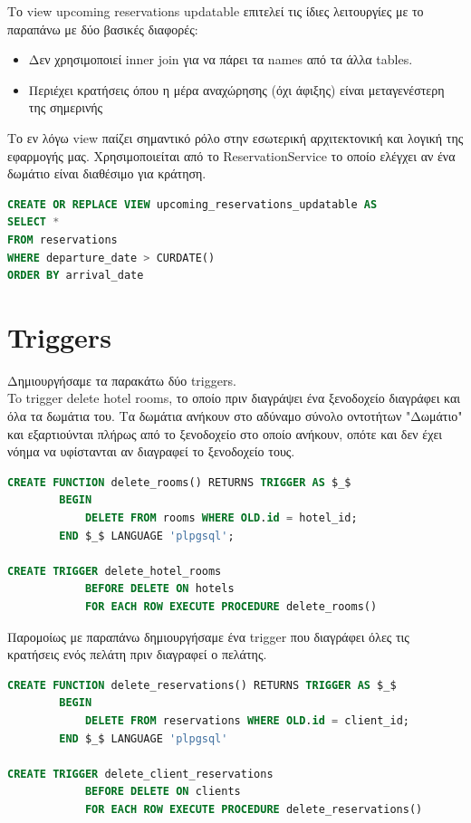 \documentclass[a4paper,12pt]{article}
\begin{document}
Το view upcoming reservations updatable επιτελεί τις ίδιες λειτουργίες με το παραπάνω με δύο βασικές διαφορές:
\begin{itemize}
  \item Δεν χρησιμοποιεί inner join για να πάρει τα names από τα άλλα tables.
  \item Περιέχει κρατήσεις όπου η μέρα αναχώρησης (όχι άφιξης) είναι μεταγενέστερη της σημερινής
\end{itemize}
Το εν λόγω view παίζει σημαντικό ρόλο στην εσωτερική αρχιτεκτονική και λογική της εφαρμογής μας. Χρησιμοποιείται από το ReservationService το οποίο ελέγχει αν ένα δωμάτιο είναι διαθέσιμο για κράτηση.

\begin{lstlisting}[language=SQL]
CREATE OR REPLACE VIEW upcoming_reservations_updatable AS
SELECT *
FROM reservations
WHERE departure_date > CURDATE()
ORDER BY arrival_date
\end{lstlisting}

\section{Triggers}
Δημιουργήσαμε τα παρακάτω δύο triggers.\\
To trigger delete hotel rooms, το οποίο πριν διαγράψει ένα ξενοδοχείο διαγράφει και όλα τα δωμάτια του. Τα δωμάτια ανήκουν στο  αδύναμο σύνολο οντοτήτων "Δωμάτιο" και εξαρτιούνται πλήρως από το ξενοδοχείο στο οποίο ανήκουν, οπότε και δεν έχει νόημα να υφίστανται αν διαγραφεί το ξενοδοχείο τους.

\begin{lstlisting}[language=SQL]
CREATE FUNCTION delete_rooms() RETURNS TRIGGER AS $_$
        BEGIN
            DELETE FROM rooms WHERE OLD.id = hotel_id;
        END $_$ LANGUAGE 'plpgsql';
        
CREATE TRIGGER delete_hotel_rooms
  			BEFORE DELETE ON hotels 
  			FOR EACH ROW EXECUTE PROCEDURE delete_rooms() 
\end{lstlisting}

Παρομοίως με παραπάνω δημιουργήσαμε ένα trigger που διαγράφει όλες τις κρατήσεις ενός πελάτη πριν διαγραφεί ο πελάτης.

\begin{lstlisting}[language=SQL]
CREATE FUNCTION delete_reservations() RETURNS TRIGGER AS $_$
        BEGIN
            DELETE FROM reservations WHERE OLD.id = client_id;
        END $_$ LANGUAGE 'plpgsql'
        
CREATE TRIGGER delete_client_reservations
  			BEFORE DELETE ON clients
  			FOR EACH ROW EXECUTE PROCEDURE delete_reservations()       
\end{lstlisting}
\end{document}
